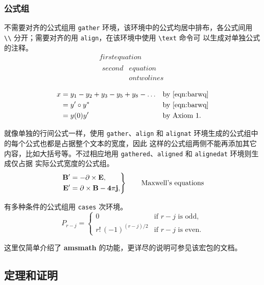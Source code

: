 \subsubsection{公式组}

不需要对齐的公式组用 \texttt{gather} 环境，该环境中的公式均居中排布，各公式间用
\verb|\\| 分开；需要对齐的用 \texttt{align}，在该环境中使用 \verb|\text| 命令可
以生成对单独公式的注释。
\begin{gather}
  first equation\\
  \begin{split}
    second & equation\\
           & on twolines
  \end{split}
\end{gather}

\begin{align}
 x & = y_1-y_2+y_3-y_5+y_8-\dots && \text{by \eqref{eqn:barwq}}\\
   & = y'\circ y^*               && \text{by \eqref{eqn:barwq}}\\
   & = y(0) y'                   && \text{by Axiom 1.}
\end{align}

就像单独的行间公式一样，使用 \texttt{gather}、\texttt{align} 和
\texttt{alignat} 环境生成的公式组中的每个公式也都是占据整个文本的宽度，因此
这样的公式组两侧不能再添加其它内容，比如大括号等。不过相应地用
\texttt{gathered}、\texttt{aligned} 和 \texttt{alignedat} 环境则生成仅占据
实际公式宽度的公式组。
\begin{equation*}
\left. \begin{aligned}
  \bf{B'}&=-\bf{\partial}\times \bf{E},\\
  \bf{E'}&=\bf{\partial}\times \bf{B} - 4\pi j,
\end{aligned}
\right\}
\qquad \text{Maxwell's equations}
\end{equation*}

有多种条件的公式组用 \texttt{cases} 次环境。
\[ P_{r-j}=\begin{cases}
  0& \text{if $r-j$ is odd},\\
  r!\,(-1)^{(r-j)/2}& \text{if $r-j$ is even}.
\end{cases} \]

这里仅简单介绍了 \textbf{amsmath} 的功能，更详尽的说明可参见该宏包的文档。

\subsection{定理和证明}


